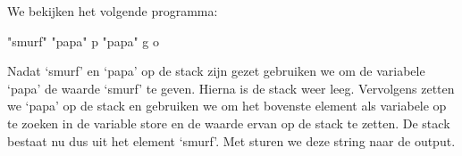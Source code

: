 \begin{exmp}
	We bekijken het volgende programma:
	\begin{smurf}"smurf" "papa" p "papa" g o\end{smurf}
	Nadat `smurf' en `papa' op de stack zijn gezet gebruiken we 
	om de variabele `papa' de waarde `smurf' te geven. Hierna is de stack weer
	leeg. Vervolgens zetten we `papa' op de stack en gebruiken we 
	om het bovenste element als variabele op te zoeken in de variable store en de
	waarde ervan op de stack te zetten. De stack bestaat nu dus uit het element
	`smurf'. Met  sturen we deze string naar de output.
\end{exmp}






